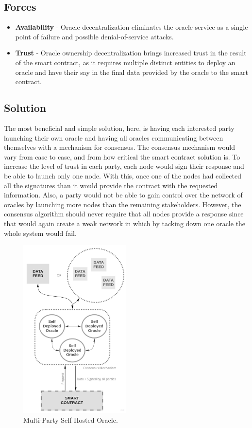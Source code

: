 \subsection{Forces}
\begin{itemize}
  \item \textbf{Availability} - Oracle decentralization eliminates the oracle service as a single point of failure and possible denial-of-service attacks.
  \item \textbf{Trust} - Oracle ownership decentralization brings increased trust in the result of the smart contract, as it requires multiple distinct entities to deploy an oracle and have their say in the final data provided by the oracle to the smart contract.
\end{itemize}

\subsection{Solution}
The most beneficial and simple solution, here, is having each interested party launching their own oracle and having all oracles communicating between themselves with a mechanism for consensus. The consensus mechanism would vary from case to case, and from how critical the smart contract solution is.
To increase the level of trust in each party, each node would sign their response and be able to launch only one node. With this, once one of the nodes had collected all the signatures than it would provide the contract with the requested information. Also, a party would not be able to gain control over the network of oracles by launching more nodes than the remaining stakeholders.
However, the consensus algorithm should never require that all nodes provide a response since that would again create a weak network in which by tacking down one oracle the whole system would fail.


\begin{figure}[t]
  \begin{center}
    \leavevmode
    \includegraphics[width=0.5\textwidth]{figures/oraclearch4.jpg}
    \caption{Multi-Party Self Hosted Oracle.}
    \label{fig:/figures/MPSelfHostedOracle}
  \end{center}
\end{figure}

